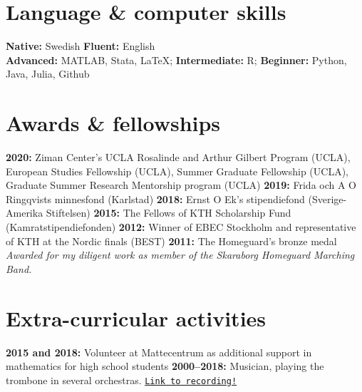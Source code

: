 \documentclass[letterpaper,10pt]{article}
\newcommand{\bold}[1]{\ifhmode\hspace{6pt}\fi\textbf{#1:}}
\begin{document}
\section*{Language \& computer skills}
\bold{Native} Swedish \bold{Fluent} English \\
\bold{Advanced} MATLAB, Stata, \LaTeX; \bold{Intermediate} R; \bold{Beginner} Python, Java, Julia, Github

\section*{Awards \& fellowships}
\bold{2020} Ziman Center’s UCLA Rosalinde and Arthur Gilbert Program (UCLA), European Studies Fellowship (UCLA), Summer Graduate Fellowship (UCLA), Graduate Summer Research Mentorship program (UCLA) \bold{2019} Frida och A O Ringqvists minnesfond (Karlstad) \bold{2018} Ernst O Ek's stipendiefond (Sverige-Amerika Stiftelsen) \bold{2015}
The Fellows of KTH Scholarship Fund (Kamratstipendiefonden) \bold{2012} Winner of EBEC Stockholm and representative of KTH at the Nordic finals (BEST) \bold{2011} The Homeguard's bronze medal \emph{Awarded for my diligent work as member of the Skaraborg Homeguard Marching Band.}

\section*{Extra-curricular activities} 
\bold{2015 and 2018} Volunteer at Mattecentrum as additional support in mathematics for high school students \bold{2000--2018} Musician, playing the trombone in several orchestras. \href{https://www.youtube.com/watch?v=nn6dDYi3AFg}{\texttt{Link to recording!}}
\iffalse
\iffalse
\emph{Several elected positions} in my division of KTH Student association, including:
\begin{lista2}
\emph{Treasurer} for a committee, \\
\emph{Producer} (head) for a play involving 100 people.  \bold{2011--2015}
\end{lista2}
\fi
\emph{Musician}, playing the trombone in several orchestras.%
\bold{2000--2018}

\fi
\end{document}
